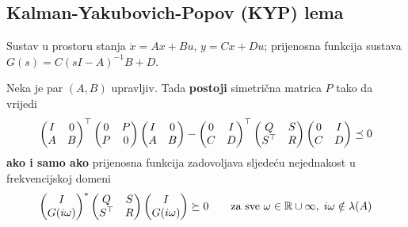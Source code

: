 \subsection{Kalman-Yakubovich-Popov (KYP) lema}

\begin{teorem}
Sustav u prostoru stanja $\dot x = Ax + Bu$, $y = Cx + Du$; prijenosna funkcija
sustava $G(s) = C(sI-A)^{-1}B + D$.

Neka je par $(A,B)$ upravljiv. Tada \textbf{postoji} simetrična matrica $P$
tako da vrijedi
\[
\begin{pmatrix}I & 0\\ A & B\end{pmatrix}^{\top}
\begin{pmatrix}0 & P\\ P & 0\end{pmatrix}
\begin{pmatrix}I & 0\\ A & B\end{pmatrix}
- \begin{pmatrix}0 & I\\ C & D\end{pmatrix}^{\top}
\begin{pmatrix}Q & S\\ S^{\top} & R\end{pmatrix}
\begin{pmatrix}0 & I\\ C & D\end{pmatrix} \preceq 0
\]
\textbf{ako i samo ako} prijenosna funkcija zadovoljava sljedeću nejednakost u
frekvencijskoj domeni
\[
\begin{pmatrix}I\\ G(i\omega)\end{pmatrix}^{*}
\begin{pmatrix}Q & S\\ S^{\top} & R\end{pmatrix}
\begin{pmatrix}I\\ G(i\omega)\end{pmatrix} \succeq 0
\qquad\text{za sve } \omega \in \mathbb{R} \cup \infty,\; i\omega \notin \lambda(A)
\]
\end{teorem}

